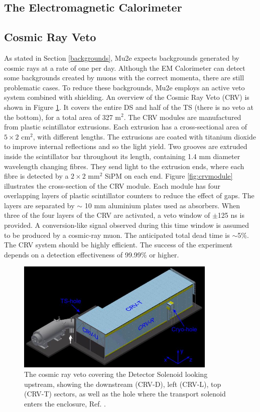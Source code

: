 \subsection{The Electromagnetic Calorimeter}\label{calorimeter}
\subsection{Cosmic Ray Veto}\label{CRV}
As stated in Section \ref{backgrounds}, Mu2e expects backgrounds generated by cosmic rays at a rate of one per day. Although the EM Calorimeter can detect some backgrounds created by muons with the correct momenta, there are still problematic cases. To reduce these backgrounds, Mu2e employs an active veto system combined with shielding. An overview of the Cosmic Ray Veto (CRV) is shown in Figure \ref{fig:crv}. It covers the entire DS and half of the TS (there is no veto at the bottom), for a total area of 327 m$^2$.
The CRV modules are manufactured from plastic scintillator extrusions. Each extrusion has a cross-sectional area of $5 \times 2$ cm$^2$, with different lengths. The extrusions are coated with titanium dioxide to improve internal reflections and so the light yield. Two grooves are extruded inside the scintillator bar throughout its length, containing 1.4 mm diameter wavelength changing fibres. They send light to the extrusion ends, where each fibre is detected by a $2 \times 2$ mm$^2$ SiPM on each end. Figure \ref{fig:crvmodule} illustrates the cross-section of the CRV module. Each module has four overlapping layers of plastic scintillator counters to reduce the effect of gaps. The layers are separated by $\sim$ 10 mm aluminium plates used as absorbers. When three of the four layers of the CRV are activated, a veto window of $\pm$125 ns is provided. A conversion-like signal observed during this time window is assumed to be produced by a cosmic-ray muon. The anticipated total dead time is $\sim$5\%. The CRV system should be highly efficient. The success of the experiment depends on a detection effectiveness of 99.99\% or higher.

\begin{figure}[!h]
\centering
\includegraphics[width =0.85\textwidth]{images/chapter2/Crv_downstream.jpg}
\caption{The cosmic ray veto covering the Detector Solenoid looking upstream, showing the downstream (CRV-D), left (CRV-L), top (CRV-T) sectors, as well as the hole where the transport solenoid enters the enclosure, Ref. \cite{bartoszek2015mu2e}.}
\label{fig:crv}
\end{figure}

